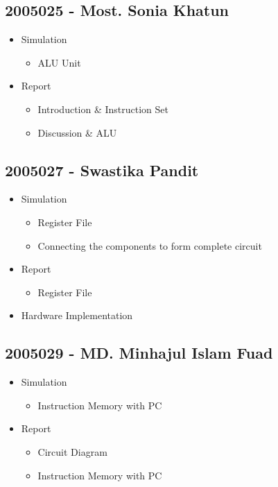 \documentclass[12]{article}
\begin{document}
\subsection*{2005025 - Most. Sonia Khatun}
    \begin{itemize}
        \item Simulation 
        \begin{itemize}
            \item ALU Unit
        \end{itemize}
        \item Report
        \begin{itemize}
            \item Introduction \& Instruction Set
            \item Discussion \& ALU
        \end{itemize}
    \end{itemize}

\subsection*{2005027 - Swastika Pandit}
\begin{itemize}
    \item Simulation
    \begin{itemize}
        \item Register File
        \item Connecting the components to form complete circuit
    \end{itemize}
    \item Report
    \begin{itemize}
        \item Register File
    \end{itemize}
    \item Hardware Implementation
\end{itemize}

\subsection*{2005029 - MD. Minhajul Islam Fuad}
\begin{itemize}
    \item Simulation
    \begin{itemize}
        \item Instruction Memory with PC
    \end{itemize}
    \item Report
    \begin{itemize}
        \item Circuit Diagram
        \item Instruction Memory with PC
    \end{itemize}    
\end{itemize}
\end{document}

